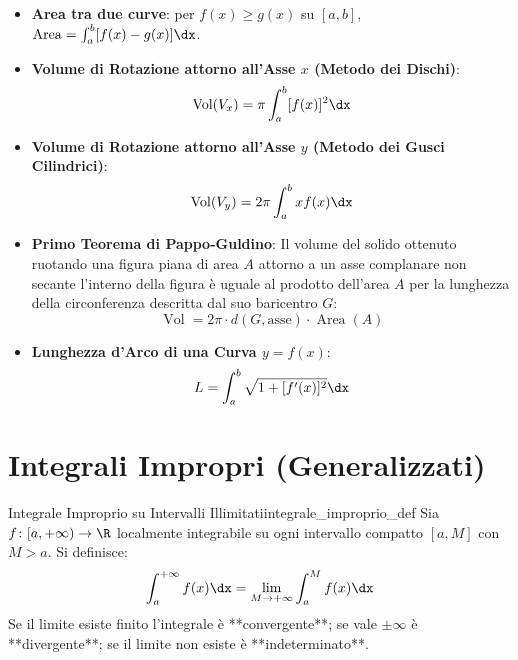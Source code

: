 \begin{metodo}
\begin{itemize}
    \item \textbf{Area tra due curve}: per $f(x) \ge g(x)$ su $[a, b]$, $\operatorname{Area} = \int_a^b [f(x) - g(x)]\dx$.
    \item \textbf{Volume di Rotazione attorno all'Asse $x$ (Metodo dei Dischi)}:
    \[
        \operatorname{Vol}(V_x) = \pi \int_a^b [f(x)]^2 \dx
    \]
    \item \textbf{Volume di Rotazione attorno all'Asse $y$ (Metodo dei Gusci Cilindrici)}:
    \[
        \operatorname{Vol}(V_y) = 2\pi \int_a^b x f(x) \dx
    \]
    \item \textbf{Primo Teorema di Pappo-Guldino}: Il volume del solido ottenuto ruotando una figura piana di area $A$ attorno a un asse complanare non secante l'interno della figura è uguale al prodotto dell'area $A$ per la lunghezza della circonferenza descritta dal suo baricentro $G$:
    \[
        \operatorname{Vol} = 2\pi \cdot d(G, \text{asse}) \cdot \operatorname{Area}(A)
    \]
    \item \textbf{Lunghezza d'Arco di una Curva $y = f(x)$}:
    \[
        L = \int_a^b \sqrt{1 + [f'(x)]^2} \dx
    \]
\end{itemize}
\end{metodo}

\section{Integrali Impropri (Generalizzati)}
\label{sec:integrali_impropri_teoria}

\begin{definizione}{Integrale Improprio su Intervalli Illimitati}{integrale_improprio_def}
Sia $f \colon [a, +\infty) \to \R$ localmente integrabile su ogni intervallo compatto $[a, M]$ con $M > a$. Si definisce:
\[
    \int_a^{+\infty} f(x) \dx = \lim_{M \to +\infty} \int_a^M f(x) \dx
\]
Se il limite esiste finito l'integrale è **convergente**; se vale $\pm \infty$ è **divergente**; se il limite non esiste è **indeterminato**.
\end{definizione}

